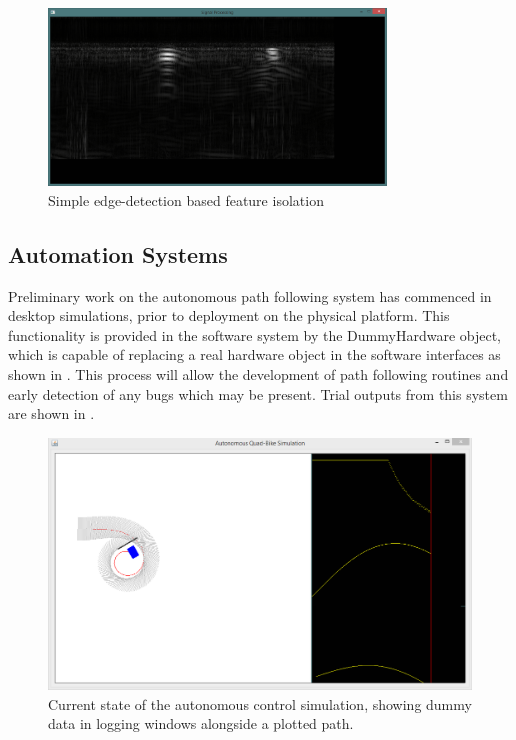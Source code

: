 \documentclass[main.tex]{subfiles}
\begin{document}
\begin{figure}[ht]
\includegraphics[width=0.8\textwidth]{7-Conclusion/edge-recognition.png}
\centering
\caption{Simple edge-detection based feature isolation}
\end{figure}
\subsection{Automation Systems}
Preliminary work on the autonomous path following system has commenced in desktop simulations, prior to deployment on the physical platform. This functionality is provided in the software system by the DummyHardware object, which is capable of replacing a real hardware object in the software interfaces as shown in . This process will allow the development of path following routines and early detection of any bugs which may be present. Trial outputs from this system are shown in .

\begin{figure}[ht]
\includegraphics[width=\textwidth]{7-Conclusion/fake2.png}
\centering
\caption[Current state of the autonomous control simulation]{Current state of the autonomous control simulation, showing dummy data in logging windows alongside a plotted path.}
\end{figure}
\end{document}
